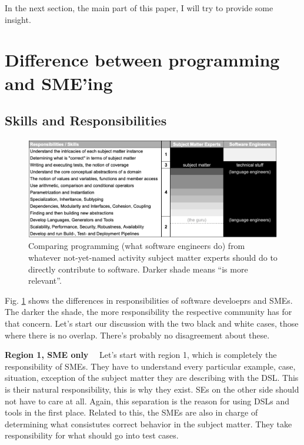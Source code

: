 \documentclass[runningheads]{llncs}
\newcommand\parhead[1]{\vspace{1mm}\noindent\textbf{{#1}}\ \ }
\newcommand{\fig}[1]{Fig. \ref{#1}}  %
\begin{document}
\noindent In the next section, the main part of this paper, I will try to provide some
insight.

\section{Difference between programming and SME'ing}



\subsection{Skills and Responsibilities}

\begin{figure}
\begin{center}
    \includegraphics[width=1\columnwidth]{figures/table-respo.png}
    \caption{Comparing programming (what software engineers do) from
    whatever not-yet-named activity subject matter experts should do to 
    directly contribute to software. Darker shade means ``is more relevant''.}
    \label{table-respo}
\end{center} 
\end{figure} 

\fig{table-respo} shows the differences in responsibilities of software
develoeprs and SMEs. The darker the shade, the more responsibility the
respective community has for that concern. Let's start our discussion
with the two black and white cases, those where there is no overlap.
There's probably no disagreement about these.

\parhead{Region 1, SME only} Let's start with region 1, which is completely the
responsibility of SMEs. They have to understand every particular example, case,
situation, exception of the subject matter they are describing with the DSL.
This is their natural responsibility, this is why they exist. SEs on the other
side should not have to care at all. Again, this separation is the reason for
using DSLs and tools in the first place. Related to this, the SMEs are also in
charge of determining what consistutes correct behavior in the subject matter.
They take responsibility for what should go into test cases.
\end{document}
